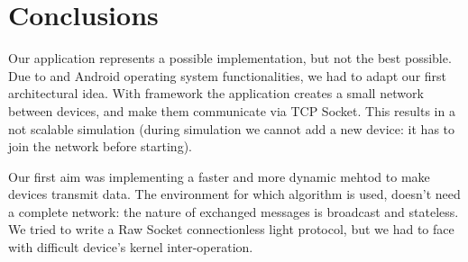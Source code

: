 \section{Conclusions}
	Our application represents a possible implementation, but not the best possible. Due to \direct and Android operating system functionalities, we had to adapt our first architectural idea. With \direct framework the application creates a small network between devices, and make them communicate via TCP Socket. This results in a not scalable simulation (during simulation we cannot add a new device: it has to join the network before starting). 
	
	Our first aim was implementing a faster and more dynamic mehtod to make devices transmit data. The environment for which algorithm is used, doesn't need a complete network: the nature of exchanged messages is broadcast and stateless. We tried to write a Raw Socket connectionless light protocol, but we had to face with difficult device's kernel inter-operation. 
